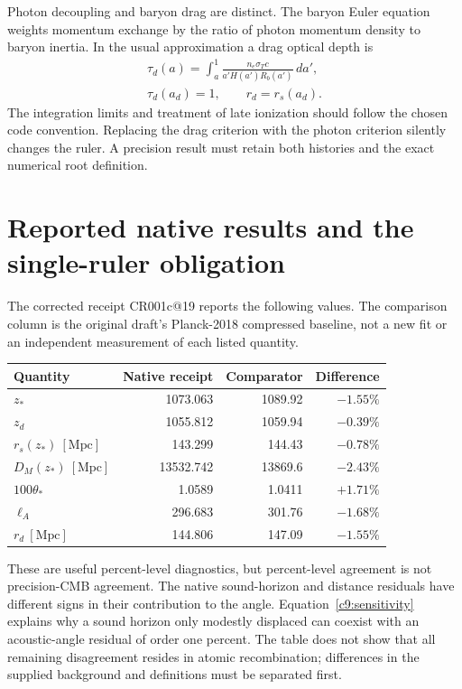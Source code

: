 Photon decoupling and baryon drag are distinct. The baryon Euler equation weights momentum exchange by the ratio of photon momentum density to baryon inertia. In the usual approximation a drag optical depth is
\begin{equation}
 \begin{gathered}
 \tau_d(a)=\int_a^1\frac{n_e\sigma_Tc}{a'H(a')R_b(a')}\,da',\\
 \tau_d(a_d)=1,\qquad r_d=r_s(a_d).
 \end{gathered}
 \label{c9:drag}
\end{equation}
The integration limits and treatment of late ionization should follow the chosen code convention. Replacing the drag criterion with the photon criterion silently changes the ruler. A precision result must retain both histories and the exact numerical root definition.

\section{Reported native results and the single-ruler obligation}

The corrected receipt CR001c@19 reports the following values. The comparison column is the original draft's Planck-2018 compressed baseline, not a new fit or an independent measurement of each listed quantity.
\begin{center}
\small\setlength{\tabcolsep}{3pt}
\begin{tabular}{@{}lrrr@{}}
\toprule
Quantity & Native receipt & Comparator & Difference\\
\midrule
$z_*$ &1073.063&1089.92&$-1.55\%$\\
$z_d$ &1055.812&1059.94&$-0.39\%$\\
$r_s(z_*)\ [\mathrm{Mpc}]$ &143.299&144.43&$-0.78\%$\\
$D_M(z_*)\ [\mathrm{Mpc}]$ &13532.742&13869.6&$-2.43\%$\\
$100\theta_*$ &1.0589&1.0411&$+1.71\%$\\
$\ell_A$ &296.683&301.76&$-1.68\%$\\
$r_d\ [\mathrm{Mpc}]$ &144.806&147.09&$-1.55\%$\\
\bottomrule
\end{tabular}
\end{center}

These are useful percent-level diagnostics, but percent-level agreement is not precision-CMB agreement. The native sound-horizon and distance residuals have different signs in their contribution to the angle. Equation~\eqref{c9:sensitivity} explains why a sound horizon only modestly displaced can coexist with an acoustic-angle residual of order one percent. The table does not show that all remaining disagreement resides in atomic recombination; differences in the supplied background and definitions must be separated first.

